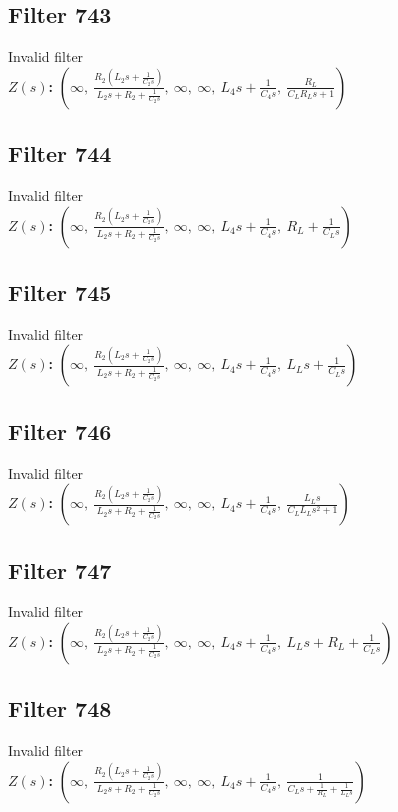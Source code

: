 \documentclass{article}
\begin{document}
\subsection*{Filter 743}
Invalid filter \\ 
\textbf{$Z(s)$:} $\left( \infty, \  \frac{R_{2} \left(L_{2} s + \frac{1}{C_{2} s}\right)}{L_{2} s + R_{2} + \frac{1}{C_{2} s}}, \  \infty, \  \infty, \  L_{4} s + \frac{1}{C_{4} s}, \  \frac{R_{L}}{C_{L} R_{L} s + 1}\right)$ \\ 
\subsection*{Filter 744}
Invalid filter \\ 
\textbf{$Z(s)$:} $\left( \infty, \  \frac{R_{2} \left(L_{2} s + \frac{1}{C_{2} s}\right)}{L_{2} s + R_{2} + \frac{1}{C_{2} s}}, \  \infty, \  \infty, \  L_{4} s + \frac{1}{C_{4} s}, \  R_{L} + \frac{1}{C_{L} s}\right)$ \\ 
\subsection*{Filter 745}
Invalid filter \\ 
\textbf{$Z(s)$:} $\left( \infty, \  \frac{R_{2} \left(L_{2} s + \frac{1}{C_{2} s}\right)}{L_{2} s + R_{2} + \frac{1}{C_{2} s}}, \  \infty, \  \infty, \  L_{4} s + \frac{1}{C_{4} s}, \  L_{L} s + \frac{1}{C_{L} s}\right)$ \\ 
\subsection*{Filter 746}
Invalid filter \\ 
\textbf{$Z(s)$:} $\left( \infty, \  \frac{R_{2} \left(L_{2} s + \frac{1}{C_{2} s}\right)}{L_{2} s + R_{2} + \frac{1}{C_{2} s}}, \  \infty, \  \infty, \  L_{4} s + \frac{1}{C_{4} s}, \  \frac{L_{L} s}{C_{L} L_{L} s^{2} + 1}\right)$ \\ 
\subsection*{Filter 747}
Invalid filter \\ 
\textbf{$Z(s)$:} $\left( \infty, \  \frac{R_{2} \left(L_{2} s + \frac{1}{C_{2} s}\right)}{L_{2} s + R_{2} + \frac{1}{C_{2} s}}, \  \infty, \  \infty, \  L_{4} s + \frac{1}{C_{4} s}, \  L_{L} s + R_{L} + \frac{1}{C_{L} s}\right)$ \\ 
\subsection*{Filter 748}
Invalid filter \\ 
\textbf{$Z(s)$:} $\left( \infty, \  \frac{R_{2} \left(L_{2} s + \frac{1}{C_{2} s}\right)}{L_{2} s + R_{2} + \frac{1}{C_{2} s}}, \  \infty, \  \infty, \  L_{4} s + \frac{1}{C_{4} s}, \  \frac{1}{C_{L} s + \frac{1}{R_{L}} + \frac{1}{L_{L} s}}\right)$ \\ 
\end{document}
